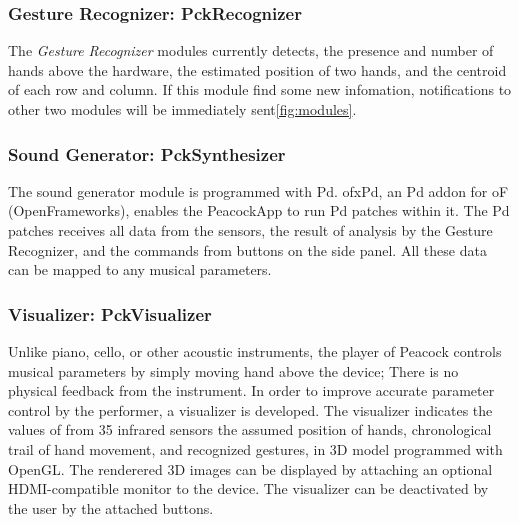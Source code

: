 \documentclass{nime-alternate}
\begin{document}
\subsubsection{Gesture Recognizer: PckRecognizer}

The {\it Gesture Recognizer} modules currently detects, the presence and number of hands above the hardware, the estimated position of two hands, and the centroid of each row and column. 
If this module find some new infomation, notifications to other two modules will be immediately sent\ref{fig:modules}.

\subsubsection{Sound Generator: PckSynthesizer}

The sound generator module is programmed with Pd\cite{Pd}. ofxPd\cite{ofxPd}, an Pd addon for oF\\(OpenFrameworks), enables the PeacockApp to run Pd patches within it. The Pd patches receives all data from the sensors, the result of analysis by the Gesture Recognizer, and the commands from buttons on the side panel. All these data can be mapped to any musical parameters.
 
\subsubsection{Visualizer: PckVisualizer}

Unlike piano, cello, or other acoustic instruments, the player of Peacock controls musical parameters by simply moving hand above the device; There is no physical feedback from the instrument. In order to improve accurate parameter control by the performer, a visualizer is developed.  The visualizer indicates the values of from 35 infrared sensors  the assumed position of hands, chronological trail of hand movement, and recognized gestures, in  3D model programmed with OpenGL\cite{OpenGL}. The renderered 3D images can be displayed by attaching an optional HDMI-compatible monitor to the device.
The visualizer can be deactivated by the user by the attached buttons.
\end{document}

